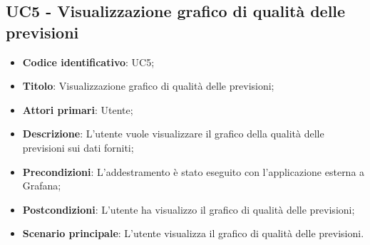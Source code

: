 \subsection{UC5 - Visualizzazione grafico di qualità delle previsioni}
\begin{itemize}
	\item \textbf{Codice identificativo}: UC5;
	\item \textbf{Titolo}: Visualizzazione grafico di qualità delle previsioni;
	\item \textbf{Attori primari}: Utente;
	\item \textbf{Descrizione}: L'utente vuole visualizzare il grafico della qualità delle previsioni sui dati forniti;
	\item \textbf{Precondizioni}: L'addestramento è stato eseguito con l'applicazione esterna a Grafana\glo;
	\item \textbf{Postcondizioni}: L'utente ha visualizzo il grafico di qualità delle previsioni;
	\item \textbf{Scenario principale}: L'utente visualizza il grafico di qualità delle previsioni.
\end{itemize} 
